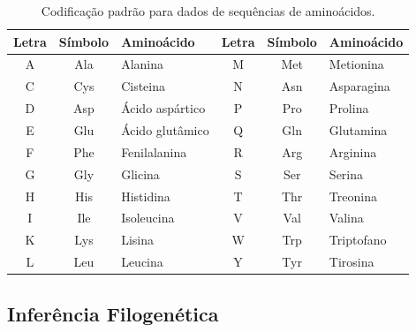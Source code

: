 \documentclass[english,brazilian]{UNISINOSmonografia} %
\newcommand\defaultFigureWidth{0.9}
\begin{document}
\begin{table}[tb]
\centering%
\begin{minipage}{\defaultFigureWidth\textwidth}
	\caption{Codificação padrão para dados de sequências de aminoácidos.}
	\label{tab:amino-codes}
	\setlength{\tabcolsep}{9pt}
	\vspace{1ex}
	\begin{tabularx}{\textwidth}{ccX|ccX}
		\toprule
		Letra & Símbolo & Aminoácido            & Letra & Símbolo & Aminoácido       \\
		\midrule
		A          & Ala     & Alanina         & M          & Met     & Metionina  \\
		C          & Cys     & Cisteina        & N          & Asn     & Asparagina \\
		D          & Asp     & Ácido aspártico & P          & Pro     & Prolina    \\
		E          & Glu     & Ácido glutâmico & Q          & Gln     & Glutamina  \\
		F          & Phe     & Fenilalanina    & R          & Arg     & Arginina   \\
		G          & Gly     & Glicina         & S          & Ser     & Serina     \\
		H          & His     & Histidina       & T          & Thr     & Treonina   \\
		I          & Ile     & Isoleucina      & V          & Val     & Valina     \\
		K          & Lys     & Lisina          & W          & Trp     & Triptofano \\
		L          & Leu     & Leucina         & Y          & Tyr     & Tirosina   \\
		\bottomrule
	\end{tabularx}
\end{minipage}
\end{table}





\subsection{Inferência Filogenética}
\label{s:phylogeneticinference}


\end{document}

